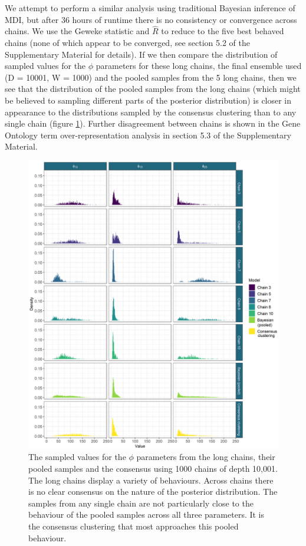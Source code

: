\documentclass{bmcart}
\begin{document}
	We attempt to perform a similar analysis using traditional Bayesian inference of MDI, but after 36 hours of runtime there is no consistency or convergence across chains.  We use the Geweke statistic and $\hat{R}$ to reduce to the five best behaved chains (none of which appear to be converged, see section 5.2 of the Supplementary Material for details). If we then compare the distribution of sampled values for the $\phi$ parameters for these long chains, the final ensemble used (D = 10001, W = 1000) and the pooled samples from the 5 long chains, then we see that the distribution of the pooled samples from the long chains (which might be believed to sampling different parts of the posterior distribution) is closer in appearance to the distributions sampled by the consensus clustering than to any single chain (figure \ref{fig:densityComparison}). Further disagreement between chains is shown in the Gene Ontology term over-representation analysis in section 5.3 of the Supplementary Material.
	
	\begin{figure}
		\centering
		\includegraphics[scale=0.147]{./Images/Yeast/ComparisonDensitiesNoTitleEdited.png}
		\caption{The sampled values for the $\phi$ parameters from the long chains, their pooled samples and the consensus using 1000 chains of depth 10,001. The long chains display a variety of behaviours. Across chains there is no clear consensus on the nature of the posterior distribution. The samples from any single chain are not particularly close to the behaviour of the pooled samples across all three parameters. It is the consensus clustering that most approaches this pooled behaviour.}
		\label{fig:densityComparison}
	\end{figure}
	
\end{document}
